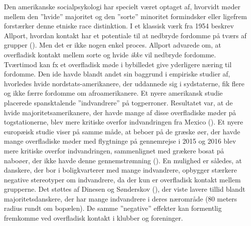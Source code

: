 \documentclass[
]{book}
\begin{document}
Den amerikanske socialpsykologi har specielt været optaget af, hvorvidt møder mellem den ''hvide'' majoritet og den ''sorte'' minoritet formindsker eller ligefrem forstærker denne etniske race distinktion. I et klassisk værk fra 1954 beskrev Allport, hvordan kontakt har et potentiale til at nedbryde fordomme på tværs af grupper (). Men det er ikke nogen enkel proces. Allport advarede om, at overfladisk kontakt mellem sorte og hvide \emph{ikke} vil nedbryde fordomme. Tværtimod kan fx et overfladisk møde i bybilledet give yderligere næring til fordomme. Den ide havde blandt andet sin baggrund i empiriske studier af, hvorledes hvide nordstats-amerikanere, der uddannede sig i sydstaterne, fik flere og ikke færre fordomme om afroamerikanere. Et nyere amerikansk studie placerede spansktalende ''indvandrere'' på togperroner. Resultatet var, at de hvide majoritetsamerikanere, der havde mange af disse overfladiske møder på togstationerne, blev mere kritiske overfor indvandringen fra Mexico (). Et nyere europæisk studie viser på samme måde, at beboer på de græske øer, der havde mange overfladiske møder med flygtninge på gennemrejse i 2015 og 2016 blev mere kritiske overfor indvandringen, sammenlignet med grækere bosat på naboøer, der ikke havde denne gennemstrømning (). En mulighed er således, at danskere, der bor i boligkvarterer med mange indvandrere, opbygger stærkere negative stereotyper om indvandrere, da der kun er overfladisk kontakt mellem grupperne. Det støttes af Dinesen og Sønderskov (), der viste lavere tillid blandt majoritetsdanskere, der har mange indvandrere i deres nærområde (80 meters radius rundt om bopælen). De samme ''negative'' effekter kan formentlig fremkomme ved overfladisk kontakt i klubber og foreninger.
\end{document}
